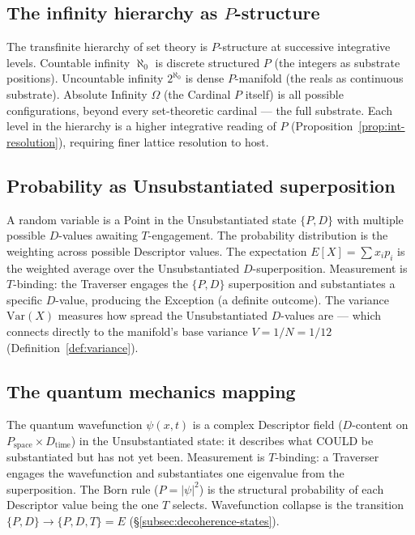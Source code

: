 \documentclass[11pt,a4paper]{article}
\theoremstyle{definition}
\theoremstyle{remark}
\begin{document}
\subsection{The infinity hierarchy as $P$-structure}\label{subsec:infinity-hierarchy}

The transfinite hierarchy of set theory is $P$-structure at successive integrative levels. Countable infinity $\aleph_{0}$ is discrete structured $P$ (the integers as substrate positions). Uncountable infinity $2^{\aleph_{0}}$ is dense $P$-manifold (the reals as continuous substrate). Absolute Infinity $\Omega$ (the Cardinal $P$ itself) is all possible configurations, beyond every set-theoretic cardinal --- the full substrate. Each level in the hierarchy is a higher integrative reading of $P$ (Proposition~\ref{prop:int-resolution}), requiring finer lattice resolution to host.

\subsection{Probability as Unsubstantiated superposition}\label{subsec:probability-unsub}

A random variable is a Point in the Unsubstantiated state $\{P,D\}$ with multiple possible $D$-values awaiting $T$-engagement. The probability distribution is the weighting across possible Descriptor values. The expectation $E[X] = \sum x_{i} p_{i}$ is the weighted average over the Unsubstantiated $D$-superposition. Measurement is $T$-binding: the Traverser engages the $\{P,D\}$ superposition and substantiates a specific $D$-value, producing the Exception (a definite outcome). The variance $\mathrm{Var}(X)$ measures how spread the Unsubstantiated $D$-values are --- which connects directly to the manifold's base variance $V = 1/N = 1/12$ (Definition~\ref{def:variance}).

\subsection{The quantum mechanics mapping}\label{subsec:QM-mapping}

The quantum wavefunction $\psi(x,t)$ is a complex Descriptor field ($D$-content on $P_{\text{space}} \times D_{\text{time}}$) in the Unsubstantiated state: it describes what COULD be substantiated but has not yet been. Measurement is $T$-binding: a Traverser engages the wavefunction and substantiates one eigenvalue from the superposition. The Born rule ($P = |\psi|^{2}$) is the structural probability of each Descriptor value being the one $T$ selects. Wavefunction collapse is the transition $\{P,D\} \to \{P,D,T\} = E$ (\S\ref{subsec:decoherence-states}).
\end{document}
